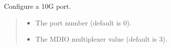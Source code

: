 \documentclass[letterpaper,10pt,english]{sphinxmanual}
\begin{document}
\begin{fulllineitems}
\label{\detokenize{cplddocs:phy_marvell_88X2222_init.cfg_10g}}
\pysigstartsignatures
{}
\pysigstopsignatures
\sphinxAtStartPar
Configure a 10G port.
\begin{quote}\begin{description}
\begin{itemize}
\item {} 
\sphinxAtStartPar
{} \textendash{} The port number (default is 0).

\item {} 
\sphinxAtStartPar
{} \textendash{} The MDIO multiplexer value (default is 3).

\end{itemize}

\end{description}\end{quote}

\end{fulllineitems}

\end{document}
